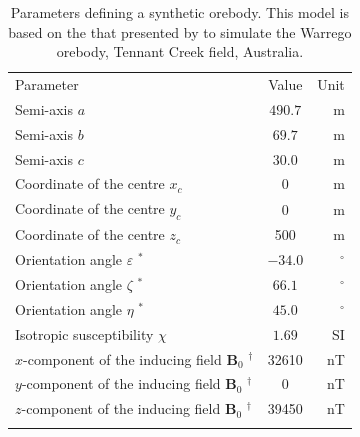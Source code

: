 \documentclass[gmd, manuscript]{copernicus}
\begin{document}
\begin{table}[t]
\caption{Parameters defining a synthetic orebody. This model is
based on the that presented by \citet{farrar1979} to simulate
the Warrego orebody, Tennant Creek field, Australia.}
\begin{tabular}{lcr}
\tophline
Parameter & Value & Unit \\
\middlehline
Semi-axis $a$ & $490.7$ & \unit{m} \\
Semi-axis $b$ & $69.7$ & \unit{m} \\
Semi-axis $c$ & $30.0$ & \unit{m} \\
Coordinate of the centre $x_{c}$ & 0 & \unit{m} \\
Coordinate of the centre $y_{c}$ & 0 & \unit{m} \\
Coordinate of the centre $z_{c}$ & 500 & \unit{m} \\
Orientation angle $\varepsilon$ $^{\ast}$ & $-34.0$ & $^{\circ}$ \\
Orientation angle $\zeta$ $^{\ast}$ & $66.1$ & $^{\circ}$ \\
Orientation angle $\eta$ $^{\ast}$ & $45.0$ & $^{\circ}$ \\
Isotropic susceptibility $\chi$ & $1.69$ & \unit{SI} \\
$x$-component of the inducing field $\mathbf{B}_{0}$ $^{\dagger}$ & 32610 & \unit{nT} \\
$y$-component of the inducing field $\mathbf{B}_{0}$ $^{\dagger}$ & 0 & \unit{nT} \\
$z$-component of the inducing field $\mathbf{B}_{0}$ $^{\dagger}$ & 39450 & \unit{nT} \\
\bottomhline
\end{tabular}
\label{tab:parameters-warrego}
\end{table}
\end{document}
